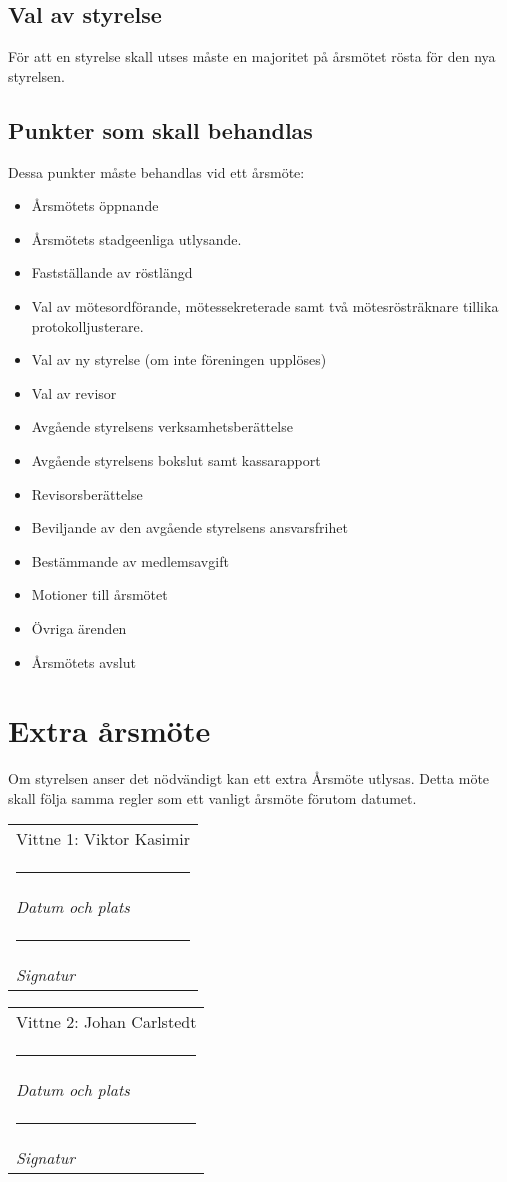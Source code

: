 \documentclass{article}
\makeatletter
\newcommand{\namesigdate}[2][5cm]{%
  \begin{tabular}{@{}p{#1}@{}}
    #2 \\[2\normalbaselineskip] \hrule \\[0pt]
    {\small \textit{Datum och plats}} \\[2\normalbaselineskip] \hrule \\[0pt]
    {\small \textit{Signatur}}
  \end{tabular}
}
\makeatother
\begin{document}
\subsection{Val av styrelse}
För att en styrelse skall utses måste en majoritet på årsmötet rösta för den nya styrelsen.

\subsection{Punkter som skall behandlas}
Dessa punkter måste behandlas vid ett årsmöte:
\begin{itemize}[noitemsep]
    \item Årsmötets öppnande
    \item Årsmötets stadgeenliga utlysande.
    \item Fastställande av röstlängd
    \item Val av mötesordförande, mötessekreterade samt två mötesrösträknare tillika protokolljusterare.
    \item Val av ny styrelse (om inte föreningen upplöses)
    \item Val av revisor
    \item Avgående styrelsens verksamhetsberättelse
    \item Avgående styrelsens bokslut samt kassarapport
    \item Revisorsberättelse
    \item Beviljande av den avgående styrelsens ansvarsfrihet
    \item Bestämmande av medlemsavgift
    \item Motioner till årsmötet
    \item Övriga ärenden
    \item Årsmötets avslut
\end{itemize}

\section{Extra årsmöte}
Om styrelsen anser det nödvändigt kan ett extra Årsmöte utlysas. Detta möte skall följa samma regler som ett vanligt årsmöte förutom datumet.


\vspace{1cm}


\noindent \namesigdate[10cm]{Vittne 1: Viktor Kasimir}
\vspace{0.5cm}

\noindent \namesigdate[10cm]{Vittne 2: Johan Carlstedt}
\vspace{0.5cm}
\end{document}
